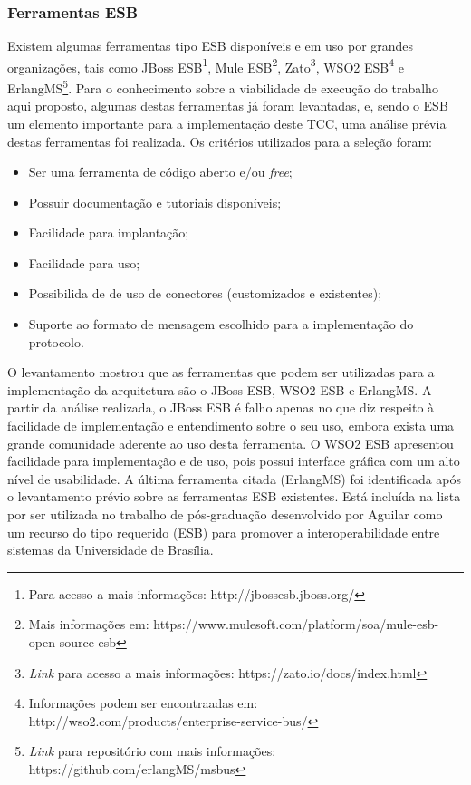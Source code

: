 \subsubsection{Ferramentas ESB}
Existem algumas ferramentas tipo ESB disponíveis e em uso por grandes organizações, tais como JBoss ESB\footnote{Para acesso a mais informações: http://jbossesb.jboss.org/}, Mule ESB\footnote{Mais informações em: https://www.mulesoft.com/platform/soa/mule-esb-open-source-esb}, Zato\footnote{\textit{Link} para acesso a mais informações: https://zato.io/docs/index.html}, WSO2 ESB\footnote{Informações podem ser encontraadas em: http://wso2.com/products/enterprise-service-bus/} e ErlangMS\footnote{\textit{Link} para repositório com mais informações: https://github.com/erlangMS/msbus}. Para o conhecimento sobre a viabilidade de execução do trabalho aqui proposto, algumas destas ferramentas já foram levantadas, e, sendo o ESB um elemento importante para a implementação deste TCC, uma análise prévia destas ferramentas foi realizada. Os critérios utilizados para a seleção foram:

\begin{itemize}
\item Ser uma ferramenta de código aberto e/ou \textit{free};
\item Possuir documentação e tutoriais disponíveis;
\item Facilidade para implantação;
\item Facilidade para uso;
\item Possibilida de de uso de conectores (customizados e existentes);
\item Suporte ao formato de mensagem escolhido para a implementação do protocolo.
\end{itemize}

O levantamento mostrou que as ferramentas que podem ser utilizadas para a implementação da arquitetura são o JBoss ESB, WSO2 ESB e ErlangMS. A partir da análise realizada, o JBoss ESB é falho apenas no que diz respeito à facilidade de implementação e entendimento sobre o seu uso, embora exista uma grande comunidade aderente ao uso desta ferramenta. O WSO2 ESB apresentou facilidade para implementação e de uso, pois possui interface gráfica com um alto nível de usabilidade. A última ferramenta citada (ErlangMS) foi identificada após o levantamento prévio sobre as ferramentas ESB existentes. Está incluída na lista por ser utilizada no trabalho de pós-graduação desenvolvido por Aguilar \cite{agilar_uma_2015} como um recurso do tipo requerido (ESB) para promover a interoperabilidade entre sistemas da Universidade de Brasília.

